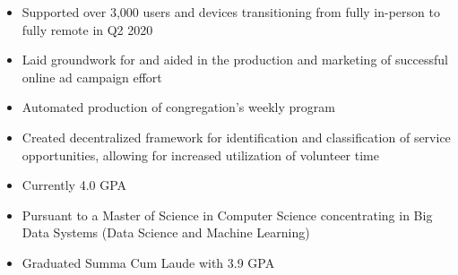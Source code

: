 \par\smallskip
\begin{minipage}{13.75cm}
  \begin{minipage}{6.5cm}
    \begin{itemize}
      \item Supported over 3,000 users and devices transitioning
            from fully in-person to fully remote in Q2 2020
      \item Laid groundwork for and aided in the production and
            marketing of successful online ad campaign effort
    \end{itemize}
  \end{minipage}
  \hfill
  \begin{minipage}{6.5cm}
    \begin{itemize}
      \item Automated production of congregation’s weekly program
      \item Created decentralized framework for identification and
            classification of service opportunities, allowing for
            increased utilization of volunteer time
    \end{itemize}
  \end{minipage}
\end{minipage}

\par\bigskip
{}
\begin{itemize}
  \item Currently 4.0 GPA
  \item Pursuant to a Master of Science in Computer Science concentrating in Big Data Systems (Data Science and Machine Learning)
\end{itemize}
\divider

\begin{itemize}
  \item Graduated Summa Cum Laude with 3.9 GPA
\end{itemize}

